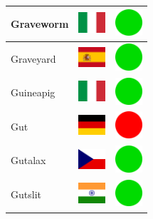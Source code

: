 \documentclass[12pt, a4paper, twoside]{report}
\begin{document}
\begin{center}
\begin{longtable}{|p{5cm}|p{2cm}|p{2cm}|}
Graveworm & \includegraphics[width=1cm]{4x3/it} & \includegraphics[width=1cm]{likes/y} \\ \hline
Graveyard & \includegraphics[width=1cm]{4x3/es} & \includegraphics[width=1cm]{likes/y} \\ \hline
Guineapig & \includegraphics[width=1cm]{4x3/it} & \includegraphics[width=1cm]{likes/y} \\ \hline
Gut & \includegraphics[width=1cm]{4x3/de} & \includegraphics[width=1cm]{likes/n} \\ \hline
Gutalax & \includegraphics[width=1cm]{4x3/cz} & \includegraphics[width=1cm]{likes/y} \\ \hline
Gutslit & \includegraphics[width=1cm]{4x3/in} & \includegraphics[width=1cm]{likes/y} \\ \hline

\end{longtable}
\end{center}
\end{document}
